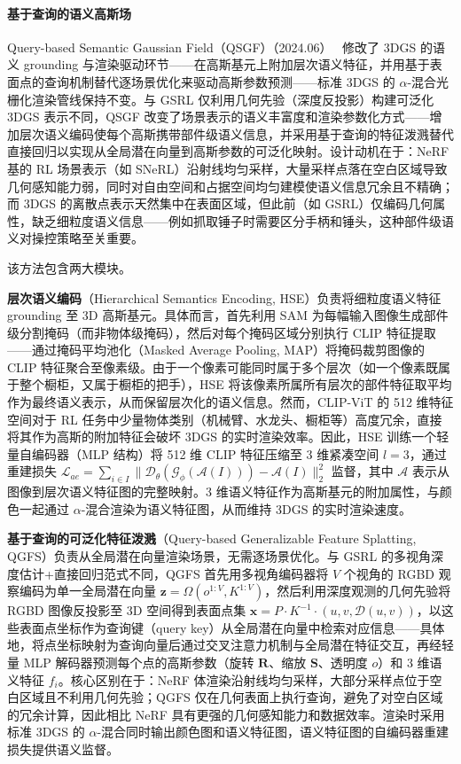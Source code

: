 \paragraph{基于查询的语义高斯场}

Query-based Semantic Gaussian Field（QSGF）（2024.06）~\cite{2406_02370} 修改了 3DGS 的语义 grounding 与渲染驱动环节——在高斯基元上附加层次语义特征，并用基于表面点的查询机制替代逐场景优化来驱动高斯参数预测——标准 3DGS 的 $\alpha$-混合光栅化渲染管线保持不变。与 GSRL 仅利用几何先验（深度反投影）构建可泛化 3DGS 表示不同，QSGF 改变了场景表示的语义丰富度和渲染参数化方式——增加层次语义编码使每个高斯携带部件级语义信息，并采用基于查询的特征泼溅替代直接回归以实现从全局潜在向量到高斯参数的可泛化映射。设计动机在于：NeRF 基的 RL 场景表示（如 SNeRL）沿射线均匀采样，大量采样点落在空白区域导致几何感知能力弱，同时对自由空间和占据空间均匀建模使语义信息冗余且不精确；而 3DGS 的离散点表示天然集中在表面区域，但此前（如 GSRL）仅编码几何属性，缺乏细粒度语义信息——例如抓取锤子时需要区分手柄和锤头，这种部件级语义对操控策略至关重要。

该方法包含两大模块。

\textbf{层次语义编码}（Hierarchical Semantics Encoding, HSE）负责将细粒度语义特征 grounding 至 3D 高斯基元。具体而言，首先利用 SAM 为每幅输入图像生成部件级分割掩码（而非物体级掩码），然后对每个掩码区域分别执行 CLIP 特征提取——通过掩码平均池化（Masked Average Pooling, MAP）将掩码裁剪图像的 CLIP 特征聚合至像素级。由于一个像素可能同时属于多个层次（如一个像素既属于整个橱柜，又属于橱柜的把手），HSE 将该像素所属所有层次的部件特征取平均作为最终语义表示，从而保留层次化的语义信息。然而，CLIP-ViT 的 512 维特征空间对于 RL 任务中少量物体类别（机械臂、水龙头、橱柜等）高度冗余，直接将其作为高斯的附加特征会破坏 3DGS 的实时渲染效率。因此，HSE 训练一个轻量自编码器（MLP 结构）将 512 维 CLIP 特征压缩至 3 维紧凑空间 $l=3$，通过重建损失 $\mathcal{L}_{ae} = \sum_{i \in I}\|\mathcal{D}_\theta(\mathcal{G}_\phi(\mathcal{A}(I))) - \mathcal{A}(I)\|_2^2$ 监督，其中 $\mathcal{A}$ 表示从图像到层次语义特征图的完整映射。3 维语义特征作为高斯基元的附加属性，与颜色一起通过 $\alpha$-混合渲染为语义特征图，从而维持 3DGS 的实时渲染速度。

\textbf{基于查询的可泛化特征泼溅}（Query-based Generalizable Feature Splatting, QGFS）负责从全局潜在向量渲染场景，无需逐场景优化。与 GSRL 的多视角深度估计+直接回归范式不同，QGFS 首先用多视角编码器将 $V$ 个视角的 RGBD 观察编码为单一全局潜在向量 $\mathbf{z} = \Omega(o^{1:V}, K^{1:V})$，然后利用深度观测的几何先验将 RGBD 图像反投影至 3D 空间得到表面点集 $\mathbf{x} = P \cdot K^{-1} \cdot (u, v, \mathcal{D}(u,v))$，以这些表面点坐标作为查询键（query key）从全局潜在向量中检索对应信息——具体地，将点坐标映射为查询向量后通过交叉注意力机制与全局潜在特征交互，再经轻量 MLP 解码器预测每个点的高斯参数（旋转 $\mathbf{R}$、缩放 $\mathbf{S}$、透明度 $o$）和 3 维语义特征 $f_i$。核心区别在于：NeRF 体渲染沿射线均匀采样，大部分采样点位于空白区域且不利用几何先验；QGFS 仅在几何表面上执行查询，避免了对空白区域的冗余计算，因此相比 NeRF 具有更强的几何感知能力和数据效率。渲染时采用标准 3DGS 的 $\alpha$-混合同时输出颜色图和语义特征图，语义特征图的自编码器重建损失提供语义监督。

